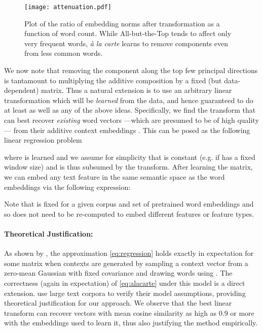 \documentclass[11pt,a4paper]{article}
\begin{document}
\begin{figure}[t!]
	\texttt{[image: attenuation.pdf]}
	\caption{\label{fig:avov}
		Plot of the ratio of embedding norms after transformation as a function of word count.
		While All-but-the-Top tends to affect only very frequent words, {\em\`a la carte} learns to remove components even from less common words.
	}
\end{figure}

We now note that removing the component along the top few principal directions is tantamount to multiplying the additive composition by a fixed (but data-dependent) matrix.
Thus a natural extension is to use an arbitrary linear transformation which will be {\em learned} from the data, and hence guaranteed to do at least as well as any of the above ideas.
Specifically, we find the transform that can best recover {\em existing} word vectors  ---which are presumed to be of high quality--- from their additive context embeddings .
This can be posed as the following linear regression problem

where  is learned and we assume for simplicity that  is constant (e.g. if  has a fixed window size) and is thus subsumed by the transform.
After learning the matrix, we can embed any text feature in the same semantic space as the word embeddings via the following expression:

Note that  is fixed for a given corpus and set of pretrained word embeddings and so does not need to be re-computed to embed different features or feature types. 

\begin{algorithm*}[!t]
	\DontPrintSemicolon
	\caption{\label{alg:induction}
		The basic {\em\`a la carte} feature embedding induction method. All contexts  consist of sequences of words drawn from the vocabulary .
	}
\end{algorithm*}

\paragraph{Theoretical Justification:}
As shown by \citet[Theorem~1]{Arora:18b}, the approximation \eqref{eq:regression} holds exactly in expectation for some matrix  when contexts  are generated by sampling a context vector  from a zero-mean Gaussian with fixed covariance and drawing  words using .
The correctness (again in expectation) of \eqref{eq:alacarte} under this model is a direct extension.
\citet{Arora:18b} use large text corpora to verify their model assumptions, providing theoretical justification for our approach. 
We observe that the best linear transform  can recover vectors with mean cosine similarity as high as 0.9 or more with the embeddings used to learn it, thus also justifying the method empirically.
\end{document}
